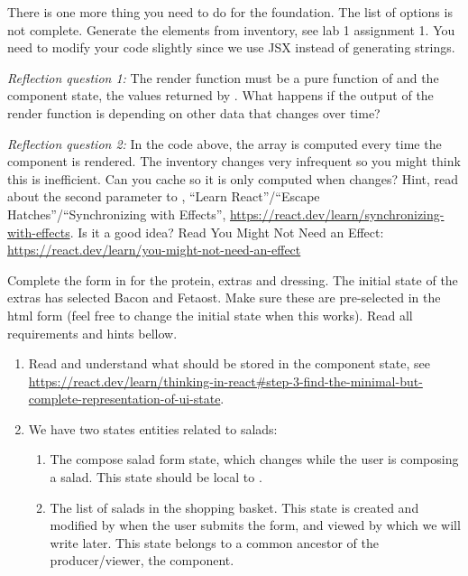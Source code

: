 \documentclass[fleqn, article, a4paper]{memoir}
\begin{document}
\begin{Assignments}
There is one more thing you need to do for the foundation. The list of options is not complete. Generate the  elements from inventory, see lab 1 assignment 1. You need to modify your code slightly since we use JSX instead of generating strings.

\emph{Reflection question 1:} The render function must be a pure function of  and the component state, the values returned by . What happens if the output of the render function is depending on other data that changes over time?

\emph{Reflection question 2:} In the code above, the  array is computed every time the component is rendered. The inventory changes very infrequent so you might think this is inefficient. Can you cache  so it is only computed when  changes? Hint, read about the second parameter to , ``Learn React''/``Escape Hatches''/``Synchronizing with Effects'', \url{https://react.dev/learn/synchronizing-with-effects}. Is it a good idea? Read You Might Not Need an Effect: \url{https://react.dev/learn/you-might-not-need-an-effect}

\item Complete the form in  for the protein, extras and dressing. The initial state of the extras has selected Bacon and Fetaost. Make sure these are pre-selected in the html form (feel free to change the initial state when this works). Read all requirements and hints bellow.
\begin{enumerate}
  \item Read and understand what should be stored in the component state, see \\\url{https://react.dev/learn/thinking-in-react#step-3-find-the-minimal-but-complete-representation-of-ui-state}.

  \item We have two states entities related to salads:
  \begin{enumerate}
    \item The compose salad form state, which changes while the user is composing a salad. This state should be local to . 
    \item The list of salads in the shopping basket. This state is created and modified by  when the user submits the form, and viewed by  which we will write later. This state belongs to a common ancestor of the producer/viewer, the  component.
  \end{enumerate}
  

\end{enumerate}
\end{Assignments}
\end{document}
